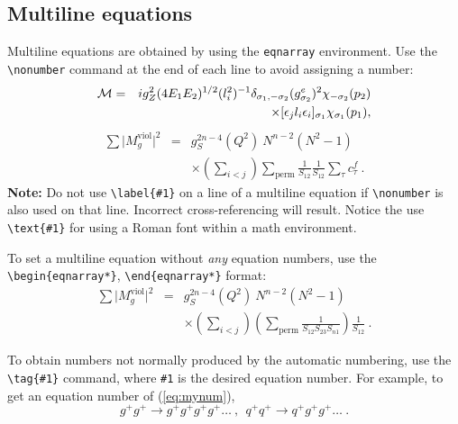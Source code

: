 \documentclass[%
 reprint,
 amsmath,amssymb,
 aps,
]{revtex4-2}
\begin{document}
\subsection{Multiline equations}

Multiline equations are obtained by using the \verb+eqnarray+
environment.  Use the \verb+\nonumber+ command at the end of each line
to avoid assigning a number:
\begin{eqnarray}
  {\cal M}=&&ig_Z^2(4E_1E_2)^{1/2}(l_i^2)^{-1}
  \delta_{\sigma_1,-\sigma_2}
  (g_{\sigma_2}^e)^2\chi_{-\sigma_2}(p_2)\nonumber\\
           &&\times
           [\epsilon_jl_i\epsilon_i]_{\sigma_1}\chi_{\sigma_1}(p_1),
\end{eqnarray}
\begin{eqnarray}
  \sum \vert M^{\text{viol}}_g \vert ^2&=&g^{2n-4}_S(Q^2)~N^{n-2}
  (N^2-1)\nonumber \\
                                       & &\times \left( \sum_{i<j}\right)
                                       \sum_{\text{perm}}
                                       \frac{1}{S_{12}}
                                       \frac{1}{S_{12}}
                                       \sum_\tau c^f_\tau~.
\end{eqnarray}
\textbf{Note:} Do not use \verb+\label{#1}+ on a line of a multiline
equation if \verb+\nonumber+ is also used on that line. Incorrect
cross-referencing will result. Notice the use \verb+\text{#1}+ for
using a Roman font within a math environment.

To set a multiline equation without \emph{any} equation
numbers, use the \verb+\begin{eqnarray*}+,
\verb+\end{eqnarray*}+ format:
\begin{eqnarray*}
  \sum \vert M^{\text{viol}}_g \vert ^2&=&g^{2n-4}_S(Q^2)~N^{n-2}
  (N^2-1)\\
                                       & &\times \left( \sum_{i<j}\right)
                                       \left(
                                         \sum_{\text{perm}}\frac{1}{S_{12}S_{23}S_{n1}}
                                       \right)
                                       \frac{1}{S_{12}}~.
\end{eqnarray*}

To obtain numbers not normally produced by the automatic numbering,
use the \verb+\tag{#1}+ command, where \verb+#1+ is the desired
equation number. For example, to get an equation number of
(\ref{eq:mynum}),
\begin{equation}
  g^+g^+ \rightarrow g^+g^+g^+g^+ \dots ~,~~q^+q^+\rightarrow
  q^+g^+g^+ \dots ~. \tag{2.6$'$}\label{eq:mynum}
\end{equation}
\end{document}

